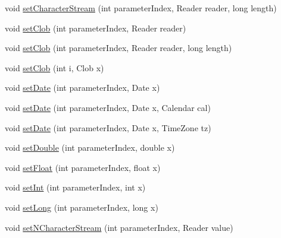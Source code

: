 \begin{DoxyCompactItemize}
\item 
void \mbox{\hyperlink{classcom_1_1mysql_1_1cj_1_1_client_prepared_query_bindings_a160c280bbfedeead1a672b68d245d613}{set\+Character\+Stream}} (int parameter\+Index, Reader reader, long length)
\item 
void \mbox{\hyperlink{classcom_1_1mysql_1_1cj_1_1_client_prepared_query_bindings_ae8fb9950a17fdd878c66249b20116274}{set\+Clob}} (int parameter\+Index, Reader reader)
\item 
void \mbox{\hyperlink{classcom_1_1mysql_1_1cj_1_1_client_prepared_query_bindings_a6e800ec3969550fb71ef9dd45f6b5b96}{set\+Clob}} (int parameter\+Index, Reader reader, long length)
\item 
void \mbox{\hyperlink{classcom_1_1mysql_1_1cj_1_1_client_prepared_query_bindings_a532773875726ace451dd1bd52d91e704}{set\+Clob}} (int i, Clob x)
\item 
void \mbox{\hyperlink{classcom_1_1mysql_1_1cj_1_1_client_prepared_query_bindings_ac826ab952eb411c43caed01901b4efe9}{set\+Date}} (int parameter\+Index, Date x)
\item 
void \mbox{\hyperlink{classcom_1_1mysql_1_1cj_1_1_client_prepared_query_bindings_a1a09b9abf41ef4cc9140772f830054ca}{set\+Date}} (int parameter\+Index, Date x, Calendar cal)
\item 
void \mbox{\hyperlink{classcom_1_1mysql_1_1cj_1_1_client_prepared_query_bindings_a6418fd43826b99ca4c7ea197e9225484}{set\+Date}} (int parameter\+Index, Date x, Time\+Zone tz)
\item 
void \mbox{\hyperlink{classcom_1_1mysql_1_1cj_1_1_client_prepared_query_bindings_ad8aebf5446194678a8119590116e8c03}{set\+Double}} (int parameter\+Index, double x)
\item 
void \mbox{\hyperlink{classcom_1_1mysql_1_1cj_1_1_client_prepared_query_bindings_a386f694bae887eb53303f921e667d1c9}{set\+Float}} (int parameter\+Index, float x)
\item 
void \mbox{\hyperlink{classcom_1_1mysql_1_1cj_1_1_client_prepared_query_bindings_a2d9f72462351602df67d21f44b21e7bf}{set\+Int}} (int parameter\+Index, int x)
\item 
void \mbox{\hyperlink{classcom_1_1mysql_1_1cj_1_1_client_prepared_query_bindings_a727ac913d960b4a22ad2da365b50fcdd}{set\+Long}} (int parameter\+Index, long x)
\item 
void \mbox{\hyperlink{classcom_1_1mysql_1_1cj_1_1_client_prepared_query_bindings_a8bb0427c0f31b94ac05615bad5c7244c}{set\+N\+Character\+Stream}} (int parameter\+Index, Reader value)
\item 

\end{DoxyCompactItemize}
